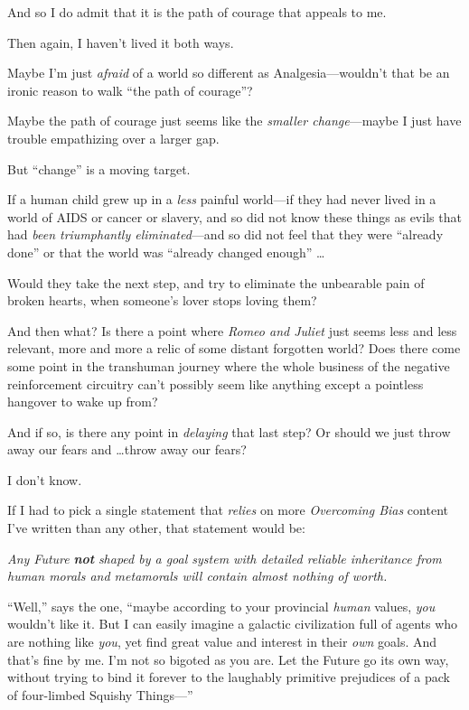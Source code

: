 {
 And so I do admit that it is the path of courage that appeals to
me.}

{
 Then again, I haven't lived it both ways.}

{
 Maybe I'm just \textit{afraid} of a world so
different as Analgesia---wouldn't that be an ironic
reason to walk ``the path of
courage''?}

{
 Maybe the path of courage just seems like the \textit{smaller
change}{}---maybe I just have trouble empathizing over a larger gap.}

{
 But ``change'' is a moving
target.}

{
 If a human child grew up in a \textit{less} painful world---if
they had never lived in a world of AIDS or cancer or slavery, and so
did not know these things as evils that had \textit{been triumphantly
eliminated}{}---and so did not feel that they were
``already done'' or that the world
was ``already changed enough''
\ldots}

{
 Would they take the next step, and try to eliminate the unbearable
pain of broken hearts, when someone's lover stops
loving them?}

{
 And then what? Is there a point where \textit{Romeo and Juliet}
just seems less and less relevant, more and more a relic of some
distant forgotten world? Does there come some point in the transhuman
journey where the whole business of the negative reinforcement
circuitry can't possibly seem like anything except a
pointless hangover to wake up from?}

{
 And if so, is there any point in \textit{delaying} that last step?
Or should we just throw away our fears and \ldots throw away our fears?}

{
 I don't know.}

\myendsectiontext


\bigskip


{
 If I had to pick a single statement that \textit{relies} on more
\textit{Overcoming Bias} content I've written than any
other, that statement would be: }

{
 \textit{Any Future }\textbf{\textit{not}}\textit{ shaped by a goal
system with detailed reliable inheritance from human morals and
metamorals will contain almost nothing of worth.}}

{
 ``Well,'' says the one,
``maybe according to your provincial \textit{human}
values, \textit{you} wouldn't like it. But I can easily
imagine a galactic civilization full of agents who are nothing like
\textit{you}, yet find great value and interest in their \textit{own}
goals. And that's fine by me. I'm not
so bigoted as you are. Let the Future go its own way, without trying to
bind it forever to the laughably primitive prejudices of a pack of
four-limbed Squishy Things---''}

